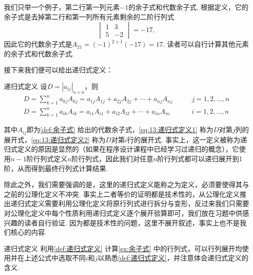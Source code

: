 \begin{solution}
    我们只举一个例子，第二行第一列元素$-1$的余子式和代数余子式. 根据定义，它的余子式是去掉第二行和第一列所有元素剩余的二阶行列式
    \[\begin{vmatrix}
            1 & 3  \\
            5 & -2
        \end{vmatrix}=-17,\]
    因此它的代数余子式是$A_{21}=(-1)^{2+1}(-17)=17$. 读者可以自行计算其他元素的余子式和代数余子式.
\end{solution}

接下来我们便可以给出递归式定义：
\begin{definition}{}{递归式定义}
    设$D=|a_{ij}|_{n \times n}$，则
    \begin{align}
        \label{eq:13:递归式定义1}
        D=\sum_{k=1}^{n}a_{kj}A_{kj}=a_{1j}A_{1j}+a_{2j}A_{2j}+\cdots+a_{nj}A_{nj} & \qquad j=1,2,\ldots,n \\
        \label{eq:13:递归式定义2}
        D=\sum_{k=1}^{n}a_{ik}A_{ik}=a_{i1}A_{i1}+a_{i2}A_{i2}+\cdots+a_{in}A_{in} & \qquad i=1,2,\ldots,n
    \end{align}
\end{definition}
其中$A_{ij}$即为\autoref{def:余子式} 给出的代数余子式，\autoref{eq:13:递归式定义1} 称为$D$对第$j$列的展开式，\autoref{eq:13:递归式定义2} 称为$D$对第$i$行的展开式. 事实上，这一定义被称为递归式定义的原因是显然的（如果在程序设计课程中已经学习过递归的概念），它使用$n-1$阶行列式定义$n$阶行列式，因此我们对任意$n$阶行列式都可以递归展开到1阶，从而得到最终行列式计算结果.

除此之外，我们需要强调的是，这里的递归式定义能称之为定义，必须要使得其与之前的公理化定义不冲突. 事实上二者等价的证明都是技术性的，从公理化定义推出递归式定义需要利用公理化定义将原行列式进行拆分与变形，反过来我们只需要对公理化定义中每个性质利用递归式定义逐个展开验算即可，我们放在习题中供感兴趣的读者自行验证. 因为都是技术性的问题，这里不展开叙述，事实上也不是我们核心的内容.
\begin{example}{}{递归式定义}
    利用\autoref{def:递归式定义} 计算\autoref{ex:余子式} 中的行列式，可以行列展开均使用并在上述公式中选取不同$i$和$j$以熟悉\autoref*{def:递归式定义}，并注意体会递归式定义的含义.
\end{example}

